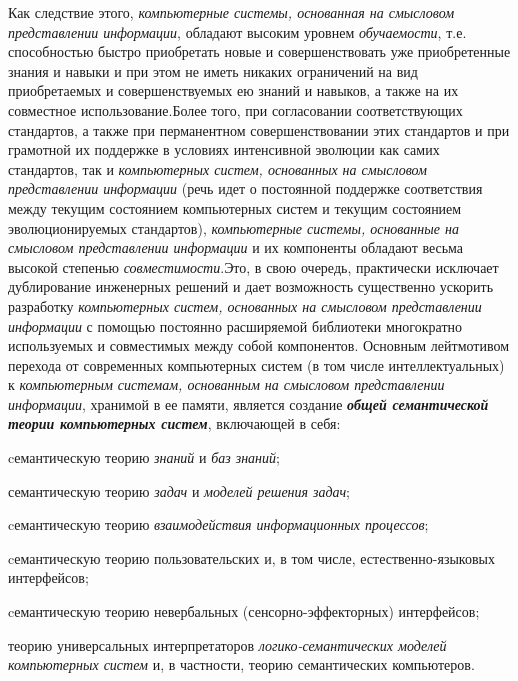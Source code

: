 \begin{SCn}
\begin{scnsubstruct}
{			Как следствие этого, \textit{компьютерные системы, основанная на
				смысловом представлении информации}, обладают высоким уровнем
			\textit{обучаемости}, т.е. способностью быстро приобретать новые и
			совершенствовать уже приобретенные знания и навыки и при этом не иметь никаких
			ограничений на вид приобретаемых и совершенствуемых ею знаний и навыков, а
			также на их совместное использование.Более того, при согласовании
			соответствующих стандартов, а также при перманентном совершенствовании этих
			стандартов и при грамотной их поддержке в условиях интенсивной эволюции как
			самих стандартов, так и \textit{компьютерных систем, основанных на смысловом
				представлении информации} (речь идет о постоянной поддержке соответствия между
			текущим состоянием компьютерных систем и текущим состоянием эволюционируемых
			стандартов), \textit{компьютерные системы, основанные на смысловом
				представлении информации} и их компоненты обладают весьма высокой степенью
			\textit{совместимости}.Это, в свою очередь, практически исключает дублирование
			инженерных решений и дает возможность существенно ускорить разработку
			\textit{компьютерных систем, основанных на смысловом представлении информации}
			с помощью постоянно расширяемой библиотеки многократно используемых и
			совместимых между собой компонентов. Основным лейтмотивом перехода от
			современных компьютерных систем (в том числе интеллектуальных) к
			\textit{компьютерным системам, основанным на смысловом представлении
				информации}, хранимой в ее памяти, является создание \textbf{\textit{общей
					семантической теории компьютерных систем}}, включающей в себя:
			\begin{scnitemize}
				\item cемантическую теорию \textit{знаний} и \textit{баз знаний};
				\item семантическую теорию \textit{задач} и \textit{моделей решения
					задач};
				\item cемантическую теорию \textit{взаимодействия информационных
					процессов};
				\item cемантическую теорию пользовательских и, в том числе,
				естественно-языковых интерфейсов;
				\item cемантическую теорию невербальных (сенсорно-эффекторных)
				интерфейсов;
				\item теорию универсальных интерпретаторов \textit{логико-семантических
					моделей компьютерных систем} и, в частности, теорию семантических компьютеров.
			\end{scnitemize}
}
\end{scnsubstruct}
\end{SCn}
